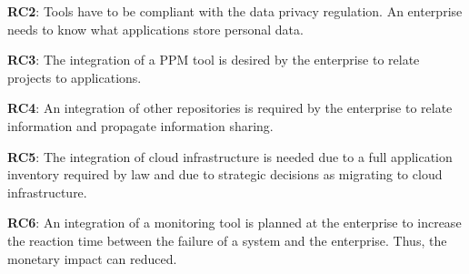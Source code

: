 \textbf{RC2}: Tools have to be compliant with the data privacy regulation. An enterprise needs to know what applications store personal data. 

\textbf{RC3}: The integration of a PPM tool is desired by the enterprise to relate projects to applications.

\textbf{RC4}: An integration of other repositories is required by the enterprise to relate information and propagate information sharing.

\textbf{RC5}: The integration of cloud infrastructure is needed due to a full application inventory required by law and due to strategic decisions as migrating to cloud infrastructure.

\textbf{RC6}: An integration of a monitoring tool is planned at the enterprise to increase the reaction time between the failure of a system and the enterprise. Thus, the monetary impact can reduced.





%









